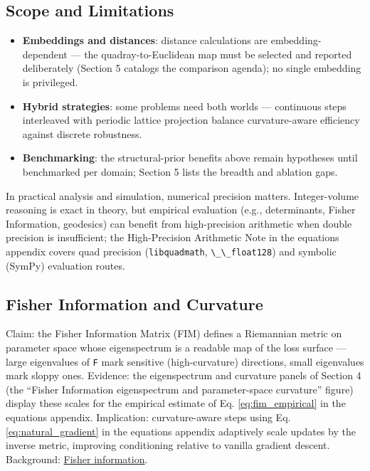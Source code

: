 \documentclass[
  10pt,
]{article}
\newcommand{\passthrough}[1]{#1}
\providecommand{\tightlist}{%
  \setlength{\itemsep}{0pt}\setlength{\parskip}{0pt}}
\begin{document}
\subsection{Scope and Limitations}\label{scope-and-limitations}

\begin{itemize}
\tightlist
\item
  \textbf{Embeddings and distances}: distance calculations are
  embedding-dependent --- the quadray-to-Euclidean map must be selected
  and reported deliberately (Section 5 catalogs the comparison agenda);
  no single embedding is privileged.
\item
  \textbf{Hybrid strategies}: some problems need both worlds ---
  continuous steps interleaved with periodic lattice projection balance
  curvature-aware efficiency against discrete robustness.
\item
  \textbf{Benchmarking}: the structural-prior benefits above remain
  hypotheses until benchmarked per domain; Section 5 lists the breadth
  and ablation gaps.
\end{itemize}

In practical analysis and simulation, numerical precision matters.
Integer-volume reasoning is exact in theory, but empirical evaluation
(e.g., determinants, Fisher Information, geodesics) can benefit from
high-precision arithmetic when double precision is insufficient; the
High-Precision Arithmetic Note in the equations appendix covers quad
precision (\passthrough{\lstinline!libquadmath!},
\passthrough{\lstinline!\_\_float128!}) and symbolic (SymPy) evaluation
routes.

\subsection{Fisher Information and
Curvature}\label{fisher-information-and-curvature}

Claim: the Fisher Information Matrix (FIM) defines a Riemannian metric
on parameter space whose eigenspectrum is a readable map of the loss
surface --- large eigenvalues of \passthrough{\lstinline!F!} mark
sensitive (high-curvature) directions, small eigenvalues mark sloppy
ones. Evidence: the eigenspectrum and curvature panels of Section 4 (the
``Fisher Information eigenspectrum and parameter-space curvature''
figure) display these scales for the empirical estimate of Eq.
\eqref{eq:fim_empirical} in the equations appendix. Implication:
curvature-aware steps using Eq. \eqref{eq:natural_gradient} in the
equations appendix adaptively scale updates by the inverse metric,
improving conditioning relative to vanilla gradient descent. Background:
\href{https://en.wikipedia.org/wiki/Fisher_information}{Fisher
information}.
\end{document}
